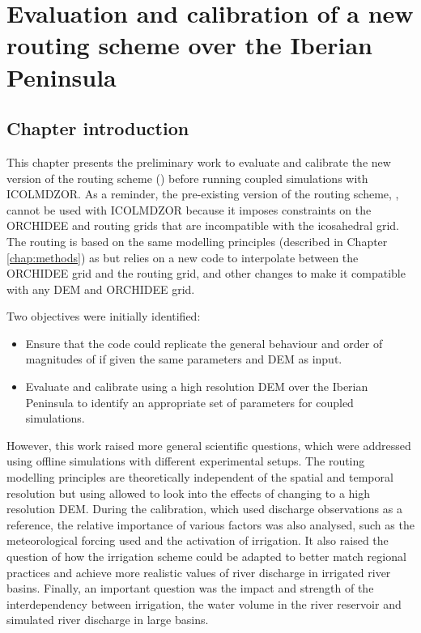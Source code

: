 \chapter{Evaluation and calibration of a new routing scheme over the Iberian Peninsula}
\label{chap:routing}
\minitoc
\pagebreak

\section{Chapter introduction}

This chapter presents the preliminary work to evaluate and calibrate the new version of the routing scheme (\native) before running coupled simulations with ICOLMDZOR. As a reminder, the pre-existing version of the routing scheme, \std, cannot be used with ICOLMDZOR because it imposes constraints on the ORCHIDEE and routing grids that are incompatible with the icosahedral grid. 
The \native routing is based on the same modelling principles (described in Chapter \ref{chap:methods}) as \std but relies on a new code to interpolate between the ORCHIDEE grid and the routing grid, and other changes to make it compatible with any DEM and ORCHIDEE grid.

Two objectives were initially identified:
\begin{itemize}
    \item Ensure that the \native code could replicate the general behaviour and order of magnitudes of \std if given the same parameters and DEM as input. 
    \item Evaluate and calibrate \native using a high resolution DEM over the Iberian Peninsula to identify an appropriate set of parameters for coupled simulations.
\end{itemize}

However, this work raised more general scientific questions, which were addressed using offline simulations with different experimental setups. The routing modelling principles are theoretically independent of the spatial and temporal resolution but using \native allowed to look into the effects of changing to a high resolution DEM. During the calibration, which used discharge observations as a reference, the relative importance of various factors was also analysed, such as the meteorological forcing used and the activation of irrigation. It also raised the question of how the irrigation scheme could be adapted to better match regional practices and achieve more realistic values of river discharge in irrigated river basins. Finally, an important question was the impact and strength of the interdependency between irrigation, the water volume in the river reservoir and simulated river discharge in large basins.

